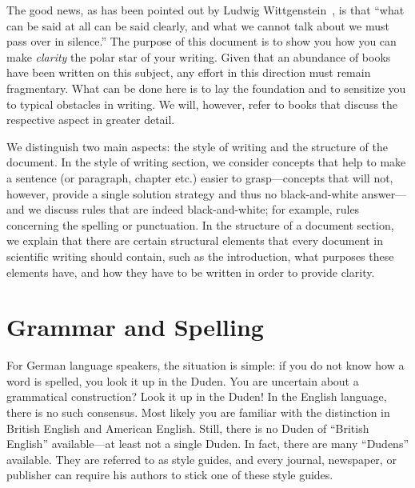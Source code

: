 The good news, as has been pointed out by Ludwig Wittgenstein~\cite{wittgenstein_tractatus_1999}, is that ``what can be said at all can be said clearly, and what we cannot talk about we must pass over in silence.'' 
The purpose of this document is to show you how you can make \emph{clarity} the polar star of your writing. 
Given that an abundance of books have been written on this subject, any effort in this direction must remain fragmentary.
What can be done here is to lay the foundation and to sensitize you to typical obstacles in writing.
We will, however, refer to books that discuss the respective aspect in greater detail. 

We distinguish two main aspects: the style of writing and the structure of the document. 
In the style of writing section, we consider concepts that help to make a sentence (or paragraph, chapter etc.)
easier to grasp---concepts that will not, however, provide a single solution strategy and thus no black-and-white answer---and we discuss rules that are indeed black-and-white; 
for example, rules concerning the spelling or punctuation. 
In the structure of a document section, we explain that there are certain structural elements that every document in scientific writing should contain, such as the introduction,  what purposes these elements have, and how they have to be written in order to provide clarity.
\clearpage

\chapter{Grammar and Spelling} %

For German language speakers, the situation is simple: 
if you do not know how a word is spelled, you look it up in the Duden. 
You are uncertain about a grammatical construction? Look it up in the Duden! 
In the English language, there is no such consensus. 
Most likely you are familiar with the distinction in British English and American English. Still, there is no Duden of ``British English'' available---at least not a single Duden.  
In fact, there are many ``Dudens'' available. 
They are referred to as style guides, and every journal, newspaper, or publisher can require his authors to stick one of these style guides. 

